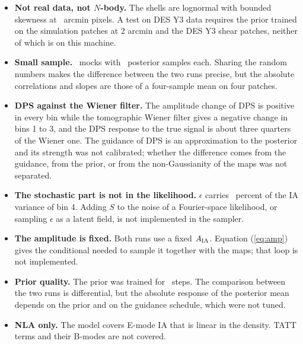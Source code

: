 \documentclass[11pt]{article}
\newcommand{\AIA}{A_{\rm IA}}
\begin{document}
\begin{itemize}
  \item \textbf{Not real data, not $N$-body.} The shells are lognormal with bounded skewness at
        \PixArcmin\ arcmin pixels. A test on DES Y3 data requires the prior trained on the
        simulation patches at 2 arcmin and the DES Y3 shear patches, neither of which is on
        this machine.
  \item \textbf{Small sample.} \NMocks\ mocks with \NSamples\ posterior samples each. Sharing the random numbers makes the difference between the two runs precise, but the absolute correlations and slopes are those of a four-sample mean on four patches.
  \item \textbf{DPS against the Wiener filter.} The amplitude change of DPS is positive in
        every bin while the tomographic Wiener filter gives a negative change in bins 1 to 3,
        and the DPS response to the true signal is about three quarters of the Wiener one. The
        guidance of DPS is an approximation to the posterior and its strength was not
        calibrated; whether the difference comes from the guidance, from the prior, or from
        the non-Gaussianity of the maps was not separated.
  \item \textbf{The stochastic part is not in the likelihood.} $\epsilon$ carries
        \ResidFracFour\ percent of the IA variance of bin 4. Adding $S$
        to the noise of a Fourier-space likelihood, or sampling $\epsilon$ as a latent field,
        is not implemented in the sampler.
  \item \textbf{The amplitude is fixed.} Both runs use a fixed $\AIA$. Equation
        (\ref{eq:amp}) gives the conditional needed to sample it together with the maps; that
        loop is not implemented.
  \item \textbf{Prior quality.} The prior was trained for \TrainSteps\ steps. The comparison between
        the two runs is differential, but the absolute response of the posterior mean depends
        on the prior and on the guidance schedule, which were not tuned.
  \item \textbf{NLA only.} The model covers E-mode IA that is linear in the density. TATT
        terms and their B-modes are not covered.
\end{itemize}
\end{document}
